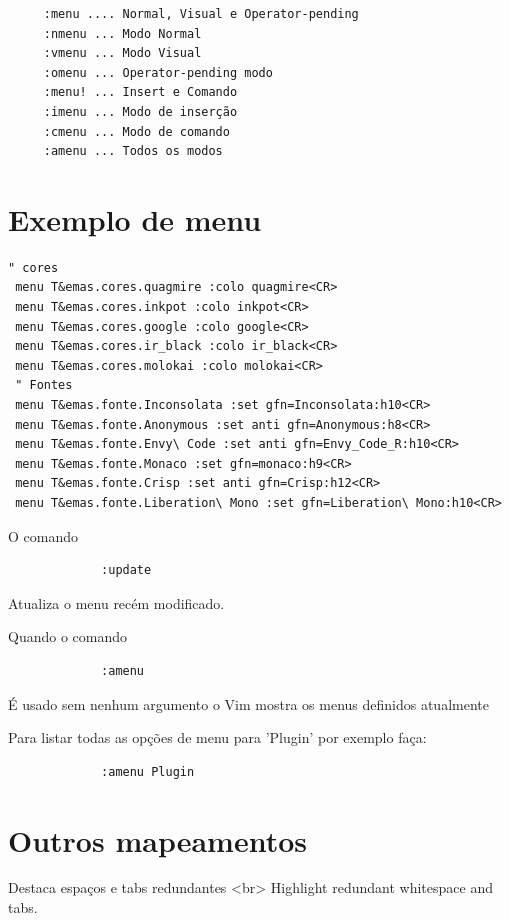 \documentclass[10pt,a4paper,openany]{book}
\begin{document}
\begin{verbatim}
	 :menu .... Normal, Visual e Operator-pending
	 :nmenu ... Modo Normal
	 :vmenu ... Modo Visual
	 :omenu ... Operator-pending modo
	 :menu! ... Insert e Comando
	 :imenu ... Modo de inserção
	 :cmenu ... Modo de comando
	 :amenu ... Todos os modos
\end{verbatim}

\section{Exemplo de menu}
\label{Exemplo de menu}

\begin{verbatim}
" cores
 menu T&emas.cores.quagmire :colo quagmire<CR>
 menu T&emas.cores.inkpot :colo inkpot<CR>
 menu T&emas.cores.google :colo google<CR>
 menu T&emas.cores.ir_black :colo ir_black<CR>
 menu T&emas.cores.molokai :colo molokai<CR>
 " Fontes
 menu T&emas.fonte.Inconsolata :set gfn=Inconsolata:h10<CR>
 menu T&emas.fonte.Anonymous :set anti gfn=Anonymous:h8<CR>
 menu T&emas.fonte.Envy\ Code :set anti gfn=Envy_Code_R:h10<CR>
 menu T&emas.fonte.Monaco :set gfn=monaco:h9<CR>
 menu T&emas.fonte.Crisp :set anti gfn=Crisp:h12<CR>
 menu T&emas.fonte.Liberation\ Mono :set gfn=Liberation\ Mono:h10<CR>
\end{verbatim}

O comando

\begin{verbatim}
			 :update
\end{verbatim}

Atualiza o menu recém modificado.

Quando o comando

\begin{verbatim}
			 :amenu
\end{verbatim}

É usado sem nenhum argumento o Vim mostra os menus definidos atualmente

Para listar todas as opções de menu para 'Plugin' por exemplo faça:

\begin{verbatim}
			 :amenu Plugin
\end{verbatim}

\section{Outros mapeamentos}
\label{Outros mapeamentos}

Destaca espaços e tabs redundantes <br>
Highlight redundant whitespace and tabs.
\end{document}
